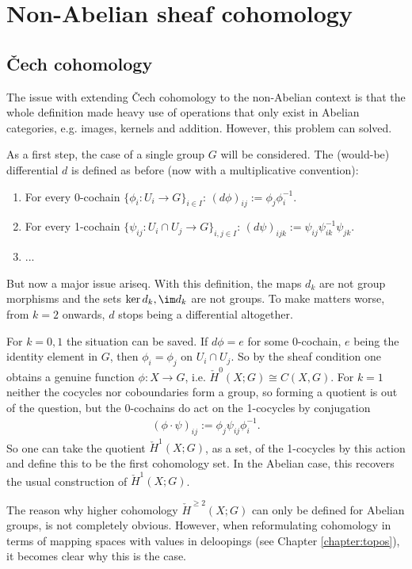 \section{Non-Abelian sheaf cohomology}
\subsection{\v{C}ech cohomology}

    The issue with extending \v{Cech} cohomology to the non-Abelian context is that the whole definition made heavy use of operations that only exist in Abelian categories, e.g. images, kernels and addition. However, this problem can solved.

    As a first step, the case of a single group $G$ will be considered. The (would-be) differential $d$ is defined as before (now with a multiplicative convention):
    \begin{enumerate}
        \item For every 0-cochain $\{\phi_i:U_i\rightarrow G\}_{i\in I}$: $(d\phi)_{ij}:=\phi_j\phi^{-1}_i$.
        \item For every 1-cochain $\{\psi_{ij}:U_i\cap U_j\rightarrow G\}_{i,j\in I}$: $(d\psi)_{ijk} := \psi_{ij}\psi^{-1}_{ik}\psi_{jk}$.
        \item ...
    \end{enumerate}
    But now a major issue ariseq. With this definition, the maps $d_k$ are not group morphisms and the sets $\ker d_k,\im d_k$ are not groups. To make matters worse, from $k=2$ onwards, $d$ stops being a differential altogether.

    For $k=0,1$ the situation can be saved. If $d\phi=e$ for some 0-cochain, $e$ being the identity element in $G$, then $\phi_i=\phi_j$ on $U_i\cap U_j$. So by the sheaf condition one obtains a genuine function $\phi:X\rightarrow G$, i.e. $\check{H}^0(X;G)\cong C(X,G)$. For $k=1$ neither the cocycles nor coboundaries form a group, so forming a quotient is out of the question, but the 0-cochains do act on the 1-cocycles by conjugation
    \begin{gather}
        (\phi\cdot\psi)_{ij} := \phi_j\psi_{ij}\phi^{-1}_i.
    \end{gather}
    So one can take the quotient $\check{H}^1(X;G)$, as a set, of the 1-cocycles by this action and define this to be the first cohomology set. In the Abelian case, this recovers the usual construction of $\check{H}^1(X;G)$.

    \begin{remark*}
        The reason why higher cohomology $\check{H}^{\geq2}(X;G)$ can only be defined for Abelian groups, is not completely obvious. However, when reformulating cohomology in terms of mapping spaces with values in deloopings (see Chapter \ref{chapter:topos}), it becomes clear why this is the case.
    \end{remark*}

